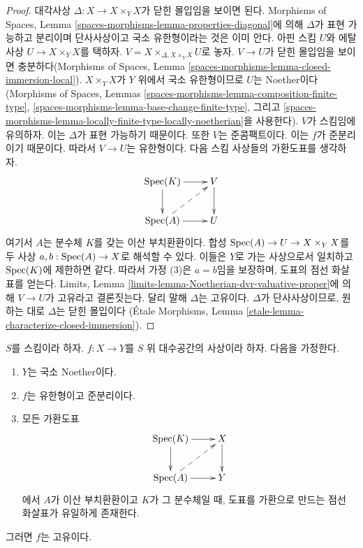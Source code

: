 \begin{proof}
대각사상 $\Delta : X \to X \times_Y X$가 닫힌 몰입임을 보이면 된다.
Morphisms of Spaces, Lemma
\ref{spaces-morphisms-lemma-properties-diagonal}에 의해 $\Delta$가 표현
가능하고 분리이며 단사사상이고 국소 유한형이라는 것은 이미 안다.
아핀 스킴 $U$와 에탈 사상
$U \to X \times_Y X$를 택하자.
$V = X \times_{\Delta, X \times_Y X} U$로 놓자.
$V \to U$가 닫힌 몰입임을 보이면 충분하다(Morphisms of Spaces,
Lemma \ref{spaces-morphisms-lemma-closed-immersion-local}).
$X \times_Y X$가 $Y$ 위에서 국소 유한형이므로 $U$는 Noether이다
(Morphisms of Spaces, Lemmas
\ref{spaces-morphisms-lemma-composition-finite-type},
\ref{spaces-morphisms-lemma-base-change-finite-type}, 그리고
\ref{spaces-morphisms-lemma-locally-finite-type-locally-noetherian}을
사용한다). $V$가 스킴임에 유의하자. 이는 $\Delta$가 표현 가능하기
때문이다.
또한 $V$는 준콤팩트이다. 이는 $f$가 준분리이기 때문이다. 따라서
$V \to U$는
유한형이다. 다음 스킴 사상들의 가환도표를 생각하자.
$$
\xymatrix{
\Spec(K) \ar[r] \ar[d] & V \ar[d] \\
\Spec(A) \ar[r] \ar@{-->}[ru] & U
}
$$
여기서 $A$는 분수체 $K$를 갖는 이산 부치환환이다. 합성
$\mathop{\mathrm{Spec}}(A) \to U \to X \times_Y X$를 두 사상
$a, b : \mathop{\mathrm{Spec}}(A) \to X$로 해석할 수 있다. 이들은 $Y$로 가는
사상으로서 일치하고 $\mathop{\mathrm{Spec}}(K)$에 제한하면 같다. 따라서 가정 (3)은
$a = b$임을 보장하며, 도표의 점선 화살표를 얻는다. Limits, Lemma
\ref{limits-lemma-Noetherian-dvr-valuative-proper}에 의해
$V \to U$가 고유라고 결론짓는다. 달리 말해 $\Delta$는 고유이다.
$\Delta$가 단사사상이므로, 원하는 대로 $\Delta$는 닫힌 몰입이다
(\'Etale Morphisms, Lemma
\ref{etale-lemma-characterize-closed-immersion}).
\end{proof}

\begin{lemma}
\label{lemma-check-proper-dvr}
$S$를 스킴이라 하자. $f : X \to Y$를 $S$ 위 대수공간의 사상이라
하자. 다음을 가정한다.
\begin{enumerate}
\item $Y$는 국소 Noether이다.
\item $f$는 유한형이고 준분리이다.
\item 모든 가환도표
$$
\xymatrix{
\Spec(K) \ar[r] \ar[d] & X \ar[d] \\
\Spec(A) \ar[r] \ar@{-->}[ru] & Y
}
$$
에서 $A$가 이산 부치환환이고 $K$가 그 분수체일 때, 도표를 가환으로
만드는 점선 화살표가 유일하게 존재한다.
\end{enumerate}
그러면 $f$는 고유이다.
\end{lemma}

